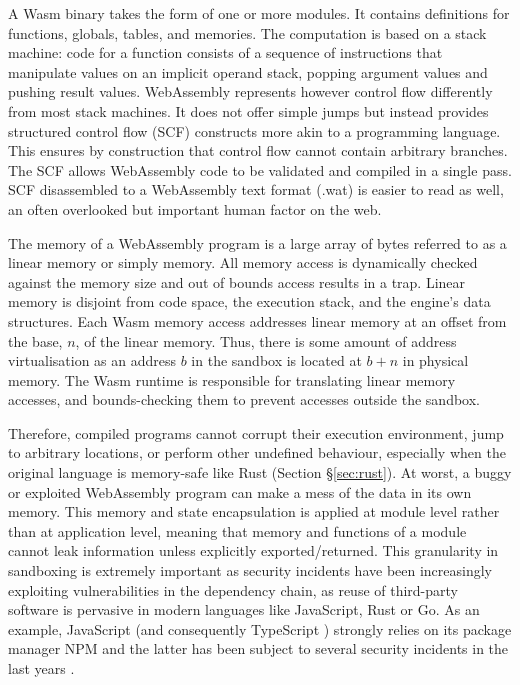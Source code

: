 \documentclass{ieeeaccess}
\begin{document}
A Wasm binary takes the form of one or more modules. It contains definitions for functions, globals, tables, and memories. The computation is based on a stack machine: code for a function consists of a sequence of instructions that manipulate values on an implicit operand stack, popping argument values and pushing result values. WebAssembly represents however control flow differently from most stack machines. It does not offer simple jumps but instead provides structured control flow (SCF) constructs more akin to a programming language. This ensures by construction that control flow cannot contain arbitrary branches. The SCF allows WebAssembly code to be validated and compiled in a single pass. SCF disassembled to a WebAssembly text format (.wat) is easier to read as well, an often overlooked but important human factor on the web.

The memory of a WebAssembly program is a large array of bytes referred to as a linear memory or simply memory. All memory access is dynamically checked against the memory size and out of bounds access results in a trap. Linear memory is disjoint from code space, the execution stack, and the engine's data structures. Each Wasm memory access addresses linear memory at an offset from the base, $n$, of the linear memory. Thus, there is some amount of address virtualisation as an address $b$ in the sandbox is located at $b + n$ in physical memory. The Wasm runtime is responsible for translating linear memory accesses, and bounds-checking them to prevent accesses outside the sandbox.

Therefore, compiled programs cannot corrupt their execution environment, jump to arbitrary locations, or perform other undefined behaviour, especially when the original language is memory-safe like Rust (Section §\ref{sec:rust}). At worst, a buggy or exploited WebAssembly program can make a mess of the data in its own memory. This memory and state encapsulation is applied at module level rather than at application level, meaning that memory and functions of a module cannot leak information unless explicitly exported/returned. This granularity in sandboxing is extremely important as security incidents have been increasingly exploiting vulnerabilities in the dependency chain, as reuse of third-party software is pervasive in modern languages like JavaScript, Rust or Go. As an example, JavaScript (and consequently TypeScript \cite{typescript}) strongly relies on its package manager NPM and the latter has been subject to several security incidents in the last years \cite{npm-security}.
\end{document}
